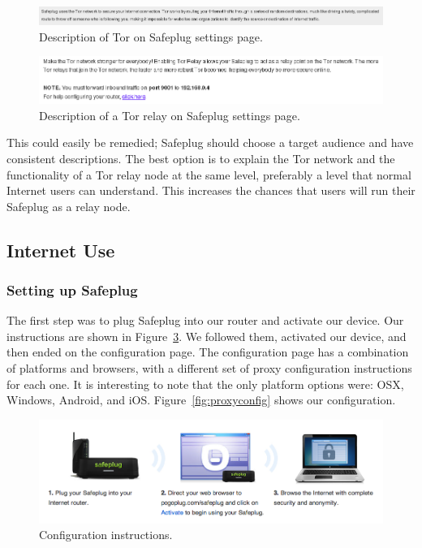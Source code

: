 \begin{figure}[th]
\begin{center}
\includegraphics[width=\textwidth]{funnydesc.png}
\caption{Description of Tor on Safeplug settings page.}
\label{fig:funnydesc}
\end{center}
\end{figure}

\begin{figure}[th]
\begin{center}
\includegraphics[width=\textwidth]{relaydesc.png}
\caption{Description of a Tor relay on Safeplug settings page.}
\label{fig:relaydesc}
\end{center}
\end{figure}

This could easily be remedied; Safeplug should choose a target audience and have consistent descriptions.  The best option is to explain the Tor network and the functionality of a Tor relay node at the same level, preferably a level that normal Internet users can understand.  This increases the chances that users will run their Safeplug as a relay node.

\subsection{Internet Use}
\label{inetuse}

\subsubsection{Setting up Safeplug} The first step was to plug Safeplug into our router and activate our device.  Our instructions are shown in Figure~\ref{fig:instructions}.  We followed them, activated our device, and then ended on the configuration page.  The configuration page has a combination of platforms and browsers, with a different set of proxy configuration instructions for each one.  It is interesting to note that the only platform options were: OSX, Windows, Android, and iOS.  Figure~\ref{fig:proxyconfig} shows our configuration. 

\begin{figure}[t]
\begin{center}
\includegraphics[width=.75\textwidth]{instructions}
\caption{Configuration instructions.}
\label{fig:instructions}
\end{center}
\end{figure}

